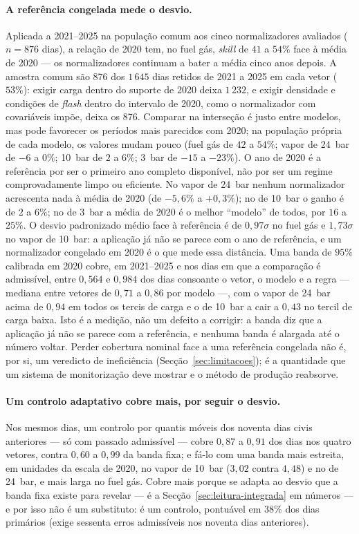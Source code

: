 \paragraph{A referência congelada mede o desvio.} Aplicada a 2021--2025 na
população comum aos cinco normalizadores avaliados ($n = 876$ dias), a
relação de 2020 tem, no fuel gás, \emph{skill} de $41$ a $54\%$ face à média
de 2020 --- os normalizadores continuam a bater a média cinco anos depois. A
amostra comum são 876 dos $1\,645$ dias retidos de 2021 a 2025 em cada vetor
($53\%$): exigir carga dentro do suporte de 2020 deixa $1\,232$, e exigir
densidade e condições de \emph{flash} dentro do intervalo de 2020, como o
normalizador com covariáveis impõe, deixa os 876. Comparar na interseção é
justo entre modelos, mas pode favorecer os períodos mais parecidos com 2020;
na população própria de cada modelo, os valores mudam pouco (fuel gás de
$42$ a $54\%$; vapor de 24~bar de $-6$ a $0\%$; 10~bar de $2$ a $6\%$;
3~bar de $-15$ a $-23\%$). O ano de 2020 é a referência por ser o primeiro
ano completo disponível, não por ser um regime comprovadamente limpo ou
eficiente.
No vapor de 24~bar nenhum normalizador acrescenta nada à média de 2020 (de
$-5{,}6\%$ a $+0{,}3\%$); no de 10~bar o ganho é de $2$ a $6\%$; no de
3~bar a média de 2020 é o melhor ``modelo'' de todos, por $16$ a $25\%$. O
desvio padronizado médio face à referência é de $0{,}97\sigma$ no fuel gás
e $1{,}73\sigma$ no vapor de 10~bar: a aplicação já não se parece com o ano
de referência, e um normalizador congelado em 2020 é o que mede essa
distância. Uma banda de $95\%$ calibrada em 2020 cobre, em 2021--2025 e nos
dias em que a comparação é admissível, entre $0{,}564$ e $0{,}984$ dos dias
consoante o vetor, o modelo e a regra --- mediana entre vetores de
$0{,}71$ a $0{,}86$ por modelo ---, com o vapor de 24~bar acima de $0{,}94$
em todos os tercis de carga e o de 10~bar a cair a $0{,}43$ no tercil de
carga baixa. Isto é a medição, não um defeito a corrigir: a banda diz que a
aplicação já não se parece com a referência, e nenhuma banda é alargada até
o número voltar. Perder cobertura nominal face a uma referência congelada
não é, por si, um veredicto de ineficiência (Secção~\ref{sec:limitacoes});
é a quantidade que um sistema de monitorização deve mostrar e o método de
produção reabsorve.

\paragraph{Um controlo adaptativo cobre mais, por seguir o desvio.} Nos
mesmos dias, um controlo por quantis móveis dos noventa dias civis
anteriores --- só com passado admissível --- cobre $0{,}87$ a $0{,}91$ dos
dias nos quatro vetores, contra $0{,}60$ a $0{,}99$ da banda fixa; e fá-lo
com uma banda mais estreita, em unidades da escala de 2020, no vapor de
10~bar ($3{,}02$ contra $4{,}48$) e no de 24~bar, e mais larga no fuel gás.
Cobre mais porque se adapta ao desvio que a banda fixa existe para revelar
--- é a Secção~\ref{sec:leitura-integrada} em números --- e por isso não é
um substituto: é um controlo, pontuável em $38\%$ dos dias primários
(exige sessenta erros admissíveis nos noventa dias anteriores).

